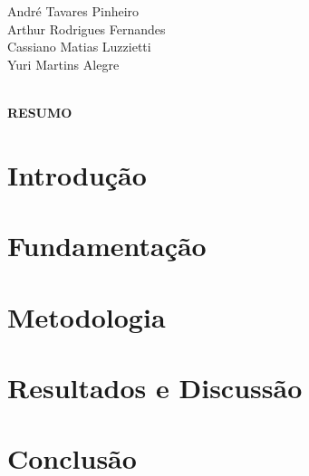 \documentclass[oneside, 12pt, a4paper]{article}
\newcommand{\autor}{
    André Tavares Pinheiro\\
    Arthur Rodrigues Fernandes\\
    Cassiano Matias Luzzietti\\
    Yuri Martins Alegre\\
}
\begin{document}
\singlespacing %
\justifying %


\begin{flushright}

    \par \autor\
    
\end{flushright}
\begin{center}

    \par \textbf{\MakeUppercase{Resumo}}
    
\end{center}



\section{Introdução}


\section{Fundamentação}
\label{sec:Fundamention}


\section{Metodologia}


\section{Resultados e Discussão}


\section{Conclusão}


\nocite{tanenbaum2021computer}
\nocite{rocholsistemas}

\end{document}
